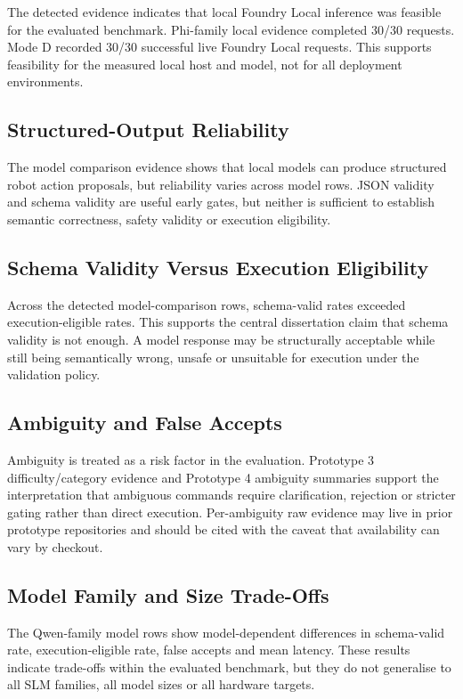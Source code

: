 \documentclass[sigconf,nonacm]{acmart}
\begin{document}
The detected evidence indicates that local Foundry Local inference was feasible for the evaluated benchmark. Phi-family local evidence completed 30/30 requests. Mode D recorded 30/30 successful live Foundry Local requests. This supports feasibility for the measured local host and model, not for all deployment environments.

\subsection{Structured-Output Reliability}

The model comparison evidence shows that local models can produce structured robot action proposals, but reliability varies across model rows. JSON validity and schema validity are useful early gates, but neither is sufficient to establish semantic correctness, safety validity or execution eligibility.

\subsection{Schema Validity Versus Execution Eligibility}

Across the detected model-comparison rows, schema-valid rates exceeded execution-eligible rates. This supports the central dissertation claim that schema validity is not enough. A model response may be structurally acceptable while still being semantically wrong, unsafe or unsuitable for execution under the validation policy.

\subsection{Ambiguity and False Accepts}

Ambiguity is treated as a risk factor in the evaluation. Prototype 3 difficulty/category evidence and Prototype 4 ambiguity summaries support the interpretation that ambiguous commands require clarification, rejection or stricter gating rather than direct execution. Per-ambiguity raw evidence may live in prior prototype repositories and should be cited with the caveat that availability can vary by checkout.

\subsection{Model Family and Size Trade-Offs}

The Qwen-family model rows show model-dependent differences in schema-valid rate, execution-eligible rate, false accepts and mean latency. These results indicate trade-offs within the evaluated benchmark, but they do not generalise to all SLM families, all model sizes or all hardware targets.
\end{document}
